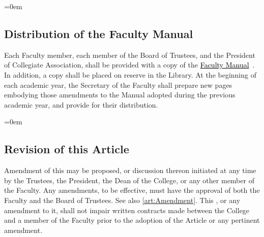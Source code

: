 \documentclass{manual}
\newcommand{\keyword}[1]{\textcolor{black}{#1}}
\newcommand{\facman}{\keyword{\underline{Faculty Manual}}~}
\let\oldsubsection\subsection
\renewcommand\subsection{\leftskip=0em\oldsubsection}
\begin{document}
\subsection{Distribution of the Faculty Manual}
Each Faculty member, each member of the Board of Trustees, and the President of Collegiate Association, shall be provided with a copy of the \facman. In addition, a copy shall be placed on reserve in the Library. At the beginning of each academic year, the Secretary of the Faculty shall prepare new pages embodying those amendments to the Manual adopted during the previous academic year, and provide for their distribution.

\subsection{Revision of this Article}\label{sec:Revision}
Amendment of this  may be proposed, or discussion thereon initiated at any time by the Trustees, the President, the Dean of the College, or any other member of the Faculty. Any amendments, to be effective, must have the approval of both the Faculty and the Board of Trustees. See also \cref{art:Amendment}. This , or any amendment to it, shall not impair written contracts made between the College and a member of the Faculty prior to the adoption of the Article or any pertinent amendment.

\end{document}
